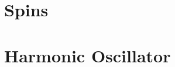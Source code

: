 \documentclass[12pt,letterpaper]{refart}
\begin{document}



\section{Spins}




\section{Harmonic Oscillator}





\clearpage

\renewcommand*{\bibfont}{\raggedright\normalfont\small}

\end{document}
